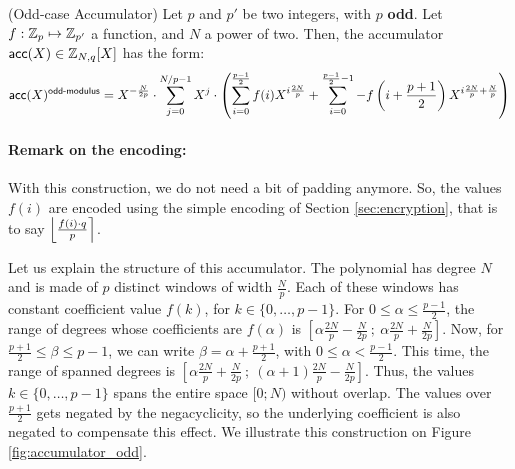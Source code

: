 \begin{definition}(Odd-case Accumulator)
	\label{def:odd_accumulator}
	Let $p$ and $p'$ be two integers, with $p$ \textbf{odd}. Let $f: \mathbb{Z}_p \mapsto \mathbb{Z}_{p'}$ a function, and $N$ a power of two. Then, the accumulator $\textsf{acc}(X) \in \mathbb{Z}_{N,q}[X]$ has the form:
	\[
		\textsf{acc}(X)^{\textsf{odd-modulus}} = X^{- \frac {N} {2p}} \cdot \sum_{j=0}^{N/p - 1} X^j  \cdot \left ( \sum_{i=0}^{\frac{p-1}{2}} f(i) X^{i \frac{2N}{p}} + \sum_{i=0}^{\frac{p-1}{2} - 1} -f \left (i + \frac{p+1}{2} \right ) X^{i \frac{2N}{p} + \frac N p} \right )
	\]
	
	\paragraph{Remark on the encoding:}
	With this construction, we do not need a bit of padding anymore. So, the values $f(i)$ are encoded using the simple encoding of Section \ref{sec:encryption}, that is to say $\left \lfloor \frac{f(i) \cdot q}{p} \right \rceil$.
\end{definition}



Let us explain the structure of this accumulator. The polynomial has degree $N$ and is made of $p$ distinct windows of width $\frac{N}{p}$. Each of these windows has constant coefficient value $f(k)$, for $k \in \{0, \dots, p-1\}$.
For $0 \le \alpha \le \frac{p-1}{2}$, the range of degrees whose coefficients are $f(\alpha)$ is $\left [ \alpha \frac{2N}{p} - \frac{N}{2p}~;~ \alpha \frac{2N}{p} + \frac{N}{2p} \right ]$. Now, for $\frac{p+1}{2} \le \beta \le p-1$, we can write $\beta = \alpha + \frac{p+1}{2}$, with $0 \le \alpha < \frac{p-1}{2}$. This time, the range of spanned degrees is $\left [ \alpha \frac{2N}{p} + \frac{N}{2p} ~;~ (\alpha + 1) \frac{2N}{p} - \frac{N}{2p} \right ]$. Thus, the values $k \in \{0, \dots, p-1\}$ spans the entire space $[0; N)$ without overlap. The values over $\frac{p+1}{2}$ gets negated by the negacyclicity, so the underlying coefficient is also negated to compensate this effect. We illustrate this construction on Figure \ref{fig:accumulator_odd}.




